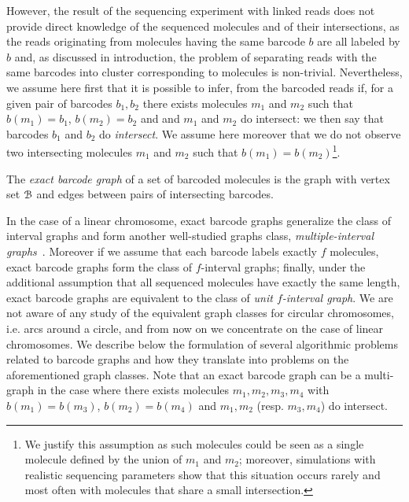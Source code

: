 However, the result of the sequencing experiment with linked reads does not provide direct knowledge of the sequenced molecules and of their intersections, as the reads originating from molecules having the same barcode $b$ are all labeled by $b$ and, as discussed in introduction, the problem of separating reads with the same barcodes into cluster corresponding to molecules is non-trivial.
Nevertheless, we assume here first that it is possible to infer, from the barcoded reads if, for a given pair of barcodes $b_1,b_2$ there exists molecules  $m_1$ and $m_2$ such that $b(m_1)=b_1$, $b(m_2)=b_2$ and  and $m_1$ and $m_2$ do intersect: we then say that barcodes $b_1$ and $b_2$ do \textit{intersect}. 
We assume here moreover that we do not observe two intersecting molecules $m_1$ and $m_2$ such that $b(m_1)=b(m_2)$\footnote{We justify this assumption as such molecules could be seen as a single molecule defined by the union of $m_1$ and $m_2$; moreover, simulations with realistic sequencing parameters show that this situation occurs rarely and most often with molecules that share a small intersection.}.

\begin{definition}
    \label{def:barcode_graph}
    The \textit{exact barcode graph} of a set of barcoded molecules is the graph with vertex set ${\cal B}{}$ and edges between pairs of intersecting barcodes. 
\end{definition}

In the case of a linear chromosome, exact barcode graphs generalize the class of interval graphs and form another well-studied graphs class, \textit{multiple-interval graphs}~\cite{FellowsHRV_2009}. 
Moreover if we assume that each barcode labels exactly $f$ molecules, exact  barcode graphs form the class of $f$-interval graphs; finally, under the additional assumption that all sequenced molecules have exactly the same length, exact barcode graphs are equivalent to the class of \textit{unit $f$-interval graph}. 
We are not aware of any study of the equivalent graph classes for circular chromosomes, i.e. arcs around a circle, and from now on we concentrate on the case of linear chromosomes.
We describe below the formulation of several algorithmic problems related to barcode graphs and how they translate into problems on the aforementioned graph classes.
Note that an exact barcode graph can be a multi-graph in the case where there exists molecules $m_1,m_2,m_3,m_4$ with $b(m_1)=b(m_3)$, $b(m_2)=b(m_4)$ and $m_1,m_2$ (resp. $m_3,m_4$) do intersect.

